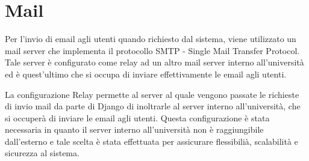 \section{Mail}
Per l'invio di email agli utenti quando richiesto dal sistema, viene utilizzato un mail server che implementa il protocollo SMTP - Single Mail Transfer Protocol. Tale server è configurato come relay ad un altro mail server interno all'università ed è quest'ultimo che si occupa di inviare effettivamente le email agli utenti.

La configurazione Relay permette al server al quale vengono passate le richieste di invio mail da parte di Django di inoltrarle al server interno all'università, che si occuperà di inviare le email agli utenti. Questa configurazione è stata necessaria in quanto il server interno all'università non è raggiungibile dall'esterno e tale scelta è stata effettuata per assicurare flessibilià, scalabilità e sicurezza al sistema.


\clearpage
